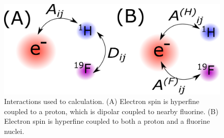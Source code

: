 \documentclass[a4paper, 12pt]{article}
\begin{document}
\begin{figure}[b]
\caption{Interactions used to calculation. (A) Electron spin is hyperfine coupled to a proton, which is dipolar coupled to nearby fluorine. (B) Electron spin is hyperfine coupled to both a proton and a fluorine nuclei.}
\label{fig:coupling}
\centering
\includegraphics[scale=0.7]{text9330-7-6-8.png}
\end{figure}
\end{document}
